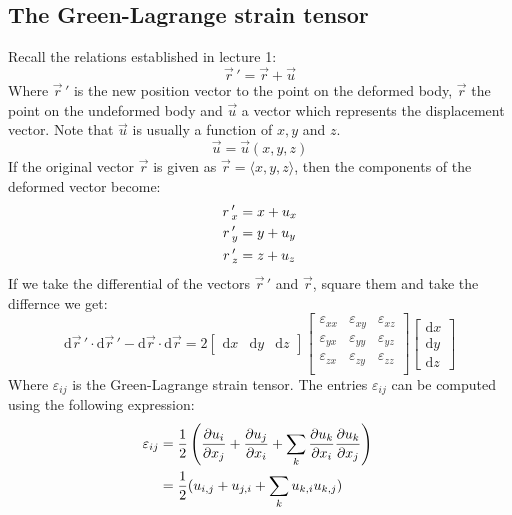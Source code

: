 \documentclass[11pt, a4paper]{article}
\renewcommand*{\epsilon}{\varepsilon}
\renewcommand*{\d}{\text{d}}
\numberwithin{equation}{section}
\numberwithin{figure}{section}
\begin{document}
\setcounter{section}{1}

\subsection{The Green-Lagrange strain tensor}
Recall the relations established in lecture 1:
\begin{equation}
  \vec{r}\,' = \vec{r} + \vec{u}
\end{equation}
Where $\vec{r}\,'$ is the new position vector to the point on the deformed body, $\vec{r}$ the point on the undeformed body and $\vec{u}$ a vector which represents the displacement vector. Note that $\vec{u}$ is usually a function of $x, y$ and $z$. 
\begin{equation}
  \vec{u} = \vec{u}(x, y, z)
\end{equation}
If the original vector $\vec{r}$ is given as $\vec{r} = \langle x, y, z \rangle$, then the components of the deformed vector become:
\begin{align}
  r\,'_x &= x + u_x \notag\\
  r\,'_y &= y + u_y \notag\\
  r\,'_z &= z + u_z
\end{align}
If we take the differential of the vectors $\vec{r}\,'$ and $\vec{r}$, square them and take the differnce we get:
\begin{equation}
  \d \vec{r}\,' \cdot \d \vec{r}\,' -  \d \vec{r}\cdot  \d \vec{r} = 2
  \begin{bmatrix}
    \d x &
    \d y &
    \d z
  \end{bmatrix}
  \begin{bmatrix}
    \epsilon_{xx} & \epsilon_{xy} & \epsilon_{xz} \\
    \epsilon_{yx} & \epsilon_{yy} & \epsilon_{yz} \\
    \epsilon_{zx} & \epsilon_{zy} & \epsilon_{zz} \\
  \end{bmatrix}
  \begin{bmatrix}
    \d x \\
    \d y \\
    \d z
  \end{bmatrix}
\end{equation}
Where $\epsilon_{ij}$ is the Green-Lagrange strain tensor. The entries $\epsilon_{ij}$ can be computed using the following expression:
\begin{align}
  \epsilon_{ij} &= \frac{1}{2} \left( \frac{\partial u_i}{\partial x_j} + \frac{\partial u_j}{\partial x_i} + \sum_k \frac{\partial u_k}{\partial x_i}\frac{\partial u_k}{\partial x_j} \right)\ \notag\\
  &= \frac{1}{2}(u_{i,j} + u_{j,i} + \sum_ku_{k,i}u_{k,j})
\end{align}
\end{document}
